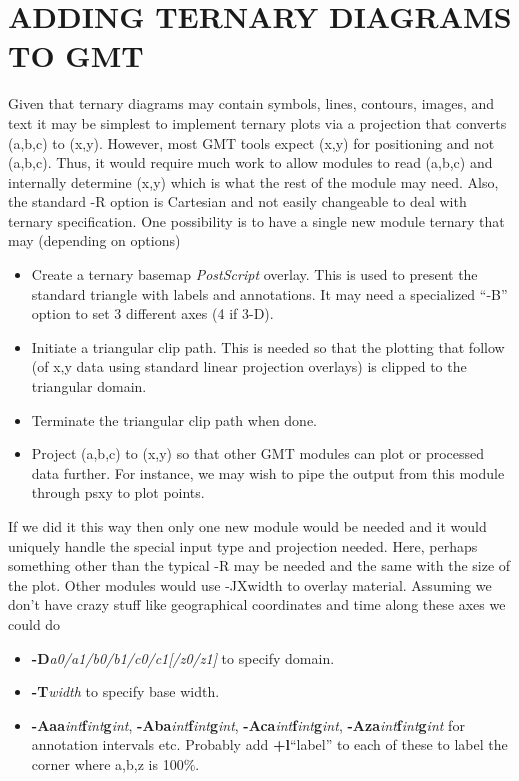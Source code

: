 \documentclass[12pt,letterpaper,margin=0.5in]{report}
\begin{document}
\section*{ADDING TERNARY DIAGRAMS TO GMT}

Given that ternary diagrams may contain symbols, lines, contours, images, and text it may
be simplest to implement ternary plots via a projection that converts (a,b,c) to (x,y).
However, most GMT tools expect (x,y) for positioning and not (a,b,c).  Thus, it would require
much work to allow modules to read (a,b,c) and internally determine (x,y) which is what
the rest of the module may need.  Also, the standard -R option is Cartesian and not easily
changeable to deal with ternary specification.  One possibility
is to have a single new module ternary that may (depending on options)
\begin{itemize}
	\item Create a ternary basemap \emph{PostScript} overlay.  This is used to present the standard triangle with labels and annotations.
	  It may need a specialized ``-B'' option to set 3 different axes (4 if 3-D).
	\item Initiate a triangular clip path.  This is needed so that the plotting that follow (of x,y data using standard
		linear projection overlays) is clipped to the triangular domain.
	\item Terminate the triangular clip path when done.
	\item Project (a,b,c) to (x,y) so that other GMT modules can plot or processed data further. For instance, we may wish to pipe
		the output from this module through psxy to plot points.
\end{itemize}
If we did it this way then only one new module would be needed and it would uniquely handle the special input type
and projection needed.  Here, perhaps something other than the typical -R may be needed and the same with the size
of the plot.  Other modules would use -JXwidth to overlay material.  Assuming we don't have crazy stuff like geographical coordinates
and time along these axes we could do
\begin{itemize}
\item {\bf -D}{\it a0/a1/b0/b1/c0/c1[/z0/z1]} to specify domain.
\item {\bf -T}{\it width} to specify base width.
\item {\bf -Aaa}{\it int}{\bf f}{\it int}{\bf g}{\it int}, {\bf -Aba}{\it int}{\bf f}{\it int}{\bf g}{\it int},
{\bf -Aca}{\it int}{\bf f}{\it int}{\bf g}{\it int}, {\bf -Aza}{\it int}{\bf f}{\it int}{\bf g}{\it int} for annotation intervals etc.
Probably add {\bf +l}``label'' to each of these to label the corner where a,b,z is 100\%.
\end{itemize}
\end{document}
